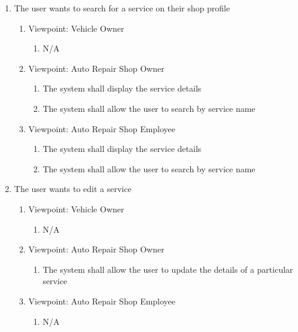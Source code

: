 \documentclass[12pt]{article}
\begin{document}
\begin{enumerate}[resume*=business_events]
	\item The user wants to search for a service on their shop profile
	      \begin{enumerate}[VP\arabic*.]
		      \item Viewpoint: Vehicle Owner
		            \begin{enumerate}
			            \item[] N/A
		            \end{enumerate}
		      \item Viewpoint: Auto Repair Shop Owner
		            \begin{enumerate}
			            \item The system shall display the service details
			            \item The system shall allow the user to search by service name
		            \end{enumerate}
		      \item Viewpoint: Auto Repair Shop Employee
		            \begin{enumerate}
			            \item The system shall display the service details
			            \item The system shall allow the user to search by service name
		            \end{enumerate}
	      \end{enumerate}

	\item The user wants to edit a service
	      \begin{enumerate}[VP\arabic*.]
		      \item Viewpoint: Vehicle Owner
		            \begin{enumerate}
			            \item[] N/A
		            \end{enumerate}
		      \item Viewpoint: Auto Repair Shop Owner
		            \begin{enumerate}
			            \item The system shall allow the user to update the details of a particular service
		            \end{enumerate}
		      \item Viewpoint: Auto Repair Shop Employee
		            \begin{enumerate}
			            \item[] N/A
		            \end{enumerate}
	      \end{enumerate}


\end{enumerate}
\end{document}

